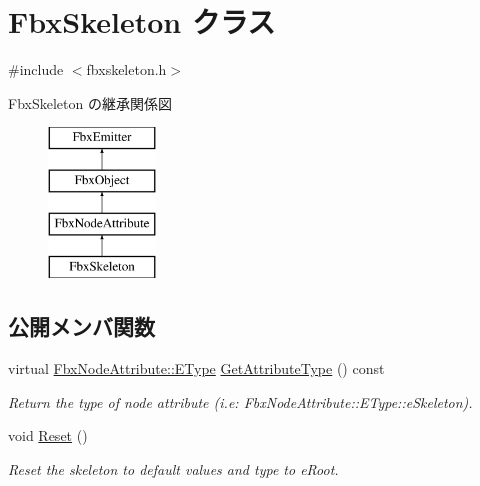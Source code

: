 \hypertarget{class_fbx_skeleton}{}\section{Fbx\+Skeleton クラス}
\label{class_fbx_skeleton}


{\ttfamily \#include $<$fbxskeleton.\+h$>$}

Fbx\+Skeleton の継承関係図\begin{figure}[H]
\begin{center}
\leavevmode
\includegraphics[height=4.000000cm]{class_fbx_skeleton}
\end{center}
\end{figure}
\subsection*{公開メンバ関数}
\begin{DoxyCompactItemize}
\item 
virtual \hyperlink{class_fbx_node_attribute_a08e1669d3d1a696910756ab17de56d6a}{Fbx\+Node\+Attribute\+::\+E\+Type} \hyperlink{class_fbx_skeleton_a3ff6cd0cae408860585d954b7249a4d9}{Get\+Attribute\+Type} () const
\begin{DoxyCompactList}\small\item\em Return the type of node attribute (i.\+e\+: Fbx\+Node\+Attribute\+::\+E\+Type\+::e\+Skeleton). \end{DoxyCompactList}\item 
void \hyperlink{class_fbx_skeleton_a622069fcb67d773d755e96b321df1094}{Reset} ()
\begin{DoxyCompactList}\small\item\em Reset the skeleton to default values and type to {\ttfamily e\+Root}. \end{DoxyCompactList}\end{DoxyCompactItemize}
